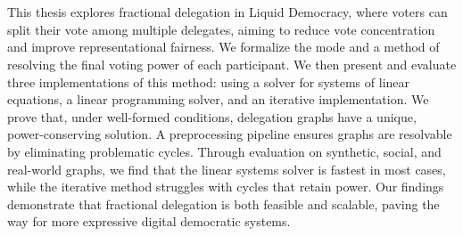 \chapter{\abstractname}

This thesis explores fractional delegation in Liquid Democracy, where voters can split their vote among multiple delegates, aiming to reduce vote concentration and improve representational fairness. We formalize the mode and a method of resolving the final voting power of each participant. We then present and evaluate three implementations of this method: using a solver for systems of linear equations, a linear programming solver, and an iterative implementation. We prove that, under well-formed conditions, delegation graphs have a unique, power-conserving solution. A preprocessing pipeline ensures graphs are resolvable by eliminating problematic cycles. Through evaluation on synthetic, social, and real-world graphs, we find that the linear systems solver is fastest in most cases, while the iterative method struggles with cycles that retain power. Our findings demonstrate that fractional delegation is both feasible and scalable, paving the way for more expressive digital democratic systems.
